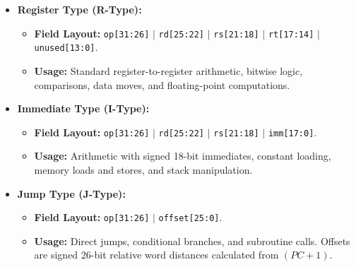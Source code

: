 \documentclass[11pt,a4paper]{article}
\begin{document}
\begin{itemize}
    \item \textbf{Register Type (R-Type):}
    \begin{itemize}
        \item \textbf{Field Layout:} \texttt{op[31:26]} $|$ \texttt{rd[25:22]} $|$ \texttt{rs[21:18]} $|$ \texttt{rt[17:14]} $|$ \texttt{unused[13:0]}.
        \item \textbf{Usage:} Standard register-to-register arithmetic, bitwise logic, comparisons, data moves, and floating-point computations.
    \end{itemize}
    \item \textbf{Immediate Type (I-Type):}
    \begin{itemize}
        \item \textbf{Field Layout:} \texttt{op[31:26]} $|$ \texttt{rd[25:22]} $|$ \texttt{rs[21:18]} $|$ \texttt{imm[17:0]}.
        \item \textbf{Usage:} Arithmetic with signed 18-bit immediates, constant loading, memory loads and stores, and stack manipulation.
    \end{itemize}
    \item \textbf{Jump Type (J-Type):}
    \begin{itemize}
        \item \textbf{Field Layout:} \texttt{op[31:26]} $|$ \texttt{offset[25:0]}.
        \item \textbf{Usage:} Direct jumps, conditional branches, and subroutine calls. Offsets are signed 26-bit relative word distances calculated from $(PC + 1)$.
    \end{itemize}
\end{itemize}
\end{document}
